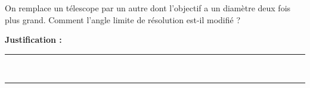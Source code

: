 On remplace un télescope par un autre dont l'objectif a un diamètre deux fois plus grand. Comment l'angle limite de résolution est-il modifié ?

\choices

\noindent\textbf{Justification :} \hrulefill \\[2.5ex]
\rule{\linewidth}{0.4pt} \\[2.5ex]
\rule{\linewidth}{0.4pt}
\vfill
